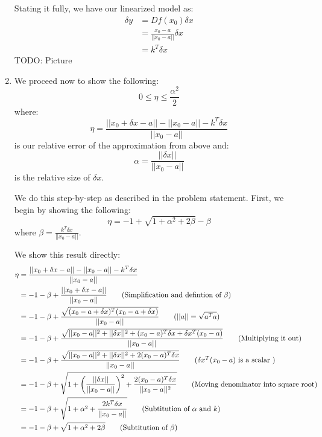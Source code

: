 \documentclass[12pt]{exam}
\begin{document}
\begin{questions}
\begin{solution}
\begin{enumerate}[label=(\alph*)]
      Stating it fully, we have our linearized model as:
      \begin{align*}
        \delta y &= Df(x_0) \delta x \\
        &= \frac{x_0 - a}{||x_0 - a||} \delta x \tag{Shown above} \\
        &= k^T\delta x \tag{Where $k$ is a unit vector pointing from $a$ to $x_0$}
      \end{align*}
      TODO: Picture

    \item We proceed now to show the following:
    \[
      0 \leq \eta \leq \frac{\alpha^2}{2}
    \]
    where:
    \[
      \eta = \frac{||x_0 + \delta x - a|| - ||x_0 - a|| - k^T \delta x}{||x_0 - a||}
    \]
    is our relative error of the approximation from above
    and:
    \[
      \alpha = \frac{||\delta x||}{|| x_0 - a||}
    \]
    is the relative size of $\delta x$.

    We do this step-by-step as described in the problem statement. First, we begin by showing the following:
    \[
      \eta = -1 + \sqrt{1 + \alpha^2 + 2\beta} - \beta
    \]
    where $\beta = \frac{ k^T \delta x }{|| x_0 - a||}$.

    We show this result directly:
    \begin{align*}
      \eta &= \frac{||x_0 + \delta x - a|| - ||x_0 - a|| - k^T \delta x}{||x_0 - a||} \\
      &= -1 - \beta + \frac{||x_0 + \delta x - a ||}{||x_0 - a ||} \tag{Simplification and defintion of $\beta$} \\
      &= -1 - \beta + \frac{\sqrt{(x_0 - a + \delta x)^T(x_0 - a + \delta x)}}{|| x_0 - a|| } \tag{$||a|| = \sqrt{a^T a}$} \\
      &= -1 - \beta + \frac{\sqrt{ ||x_0 - a||^2 + ||\delta x ||^2 + (x_0 - a)^T\delta x + \delta x^T (x_0 - a)  }}{||x_0 - a||} \tag{Multiplying it out} \\
      &= -1 - \beta + \frac{\sqrt{ ||x_0 - a||^2 + ||\delta x ||^2 + 2(x_0 - a)^T\delta x }}{||x_0 - a||} \tag{$\delta x^T (x_0 - a)$ is a scalar } \\ 
      &= -1 - \beta + \sqrt{ 1 + \left(\frac{||\delta x ||}{|| x_0 - a ||}\right)^2 + \frac{2(x_0 - a)^T\delta x}{||x_0 -a||^2} } \tag{Moving denominator into square root}\\
      &=-1 - \beta + \sqrt{ 1 + \alpha^2 + \frac{2k^T\delta x}{||x_0 - a||} } \tag{Subtitution of $\alpha$ and $k$} \\
      &= -1 - \beta + \sqrt{1 + \alpha^2 + 2\beta} \tag{Subtitution of $\beta$}
    \end{align*}


\end{enumerate}
\end{solution}
\end{questions}
\end{document}
